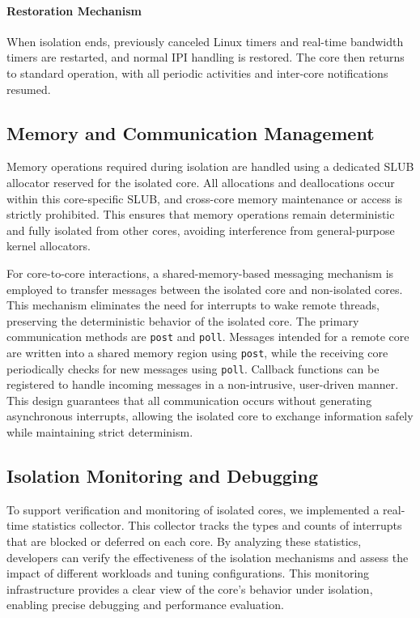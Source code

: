 \documentclass[letterpaper]{article}
\begin{document}
\paragraph{Restoration Mechanism}  
When isolation ends, previously canceled Linux timers and real-time bandwidth timers are restarted, and normal IPI handling is restored. The core then returns to standard operation, with all periodic activities and inter-core notifications resumed.


\subsection{Memory and Communication Management}
\label{subsec:memory-communication}

Memory operations required during isolation are handled using a dedicated SLUB allocator reserved for the isolated core. All allocations and deallocations occur within this core-specific SLUB, and cross-core memory maintenance or access is strictly prohibited. This ensures that memory operations remain deterministic and fully isolated from other cores, avoiding interference from general-purpose kernel allocators.

For core-to-core interactions, a shared-memory-based messaging mechanism is employed to transfer messages between the isolated core and non-isolated cores. This mechanism eliminates the need for interrupts to wake remote threads, preserving the deterministic behavior of the isolated core. The primary communication methods are \texttt{post} and \texttt{poll}. Messages intended for a remote core are written into a shared memory region using \texttt{post}, while the receiving core periodically checks for new messages using \texttt{poll}. Callback functions can be registered to handle incoming messages in a non-intrusive, user-driven manner. This design guarantees that all communication occurs without generating asynchronous interrupts, allowing the isolated core to exchange information safely while maintaining strict determinism.

\subsection{Isolation Monitoring and Debugging}
\label{subsec:isolation-monitoring}

To support verification and monitoring of isolated cores, we implemented a real-time statistics collector. This collector tracks the types and counts of interrupts that are blocked or deferred on each core. By analyzing these statistics, developers can verify the effectiveness of the isolation mechanisms and assess the impact of different workloads and tuning configurations. This monitoring infrastructure provides a clear view of the core’s behavior under isolation, enabling precise debugging and performance evaluation.
\end{document}
